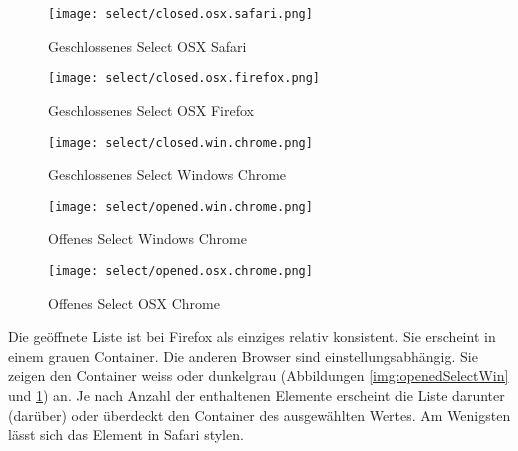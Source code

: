 \begin{figure}[!htb]
    \centering
    \begin{minipage}[b]{0.35\textwidth}
        \centering
        \begin{minipage}[t]{\textwidth}
            \centering
            \texttt{[image: select/closed.osx.safari.png]}
            \caption{\centering Geschlossenes Select OSX Safari}
            \label{img:closedSelectSafari}
        \end{minipage}
        \vspace{0.6cm}\newline
        \begin{minipage}[b]{\textwidth}
            \centering
            \texttt{[image: select/closed.osx.firefox.png]}
            \caption{\centering Geschlossenes Select OSX Firefox}
            \label{img:closedSelectFirefox}
        \end{minipage}
        \vspace{0.6cm}\newline
        \begin{minipage}[b]{\textwidth}
            \centering
            \texttt{[image: select/closed.win.chrome.png]}
            \caption{\centering Geschlossenes Select Windows Chrome}
            \label{img:closedSelectChrome}
        \end{minipage}
    \end{minipage}
    \hfill
    \begin{minipage}[b]{0.3\textwidth}
        \centering
        \texttt{[image: select/opened.win.chrome.png]}
        \caption{\centering Offenes Select Windows Chrome}
        \label{img:openedSelectWin}
    \end{minipage}
    \hfill
    \begin{minipage}[b]{0.2\textwidth}
        \centering
        \texttt{[image: select/opened.osx.chrome.png]}
        \caption{\centering Offenes Select OSX Chrome}
        \label{img:openedSelectOsx}
    \end{minipage}
\end{figure}

Die geöffnete Liste ist bei Firefox als einziges relativ konsistent. 
Sie erscheint in einem grauen Container.
Die anderen Browser sind einstellungsabhängig. 
Sie zeigen den Container weiss oder dunkelgrau (Abbildungen \ref{img:openedSelectWin} und \ref{img:openedSelectOsx}) an. 
Je nach Anzahl der enthaltenen Elemente erscheint die Liste darunter (darüber) oder überdeckt den Container des ausgewählten Wertes. 
Am Wenigsten lässt sich das Element in Safari stylen. 

